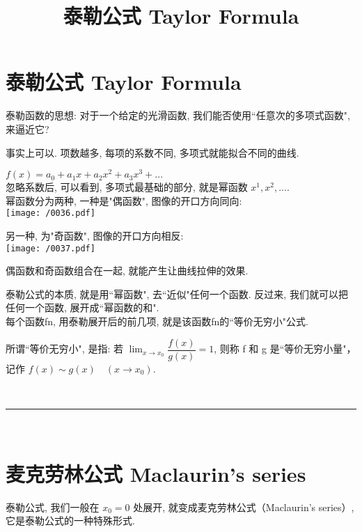 \documentclass[UTF8]{ctexart}
\title{泰勒公式 Taylor Formula}
\begin{document}
\tableofcontents %
\date{} %
\maketitle  %



\part{泰勒公式  Taylor Formula}

泰勒函数的思想: 对于一个给定的光滑函数, 我们能否使用``任意次的多项式函数", 来逼近它?

事实上可以. 项数越多, 每项的系数不同, 多项式就能拟合不同的曲线.

$f\left( x \right) =a_0+a_1x+a_2x^2+a_3x^3+...$ \\

忽略系数后, 可以看到, 多项式最基础的部分, 就是幂函数 $x^1, x^2, ...$. \\

幂函数分为两种, 一种是"偶函数", 图像的开口方向同向: \\

\texttt{[image: /0036.pdf]}

另一种, 为"奇函数", 图像的开口方向相反: \\

\texttt{[image: /0037.pdf]}

偶函数和奇函数组合在一起, 就能产生让曲线拉伸的效果.

泰勒公式的本质, 就是用``幂函数", 去``近似"任何一个函数. 反过来, 我们就可以把任何一个函数, 展开成``幂函数的和". \\

每个函数fn, 用泰勒展开后的前几项, 就是该函数fn的``等价无穷小"公式.

所谓``等价无穷小", 是指:  若 $\lim_{x \to x_0} \dfrac{f(x)} {g(x)} = 1$, 则称 f 和 g 是``等价无穷小量"，记作 $f(x) \sim g(x) \quad (x \to x_0)$.


~\\
\hrule
~\\



\part{麦克劳林公式 Maclaurin's series}

泰勒公式, 我们一般在 $x_0 =0$ 处展开, 就变成麦克劳林公式（Maclaurin's series）, 它是泰勒公式的一种特殊形式. \\
\end{document}
